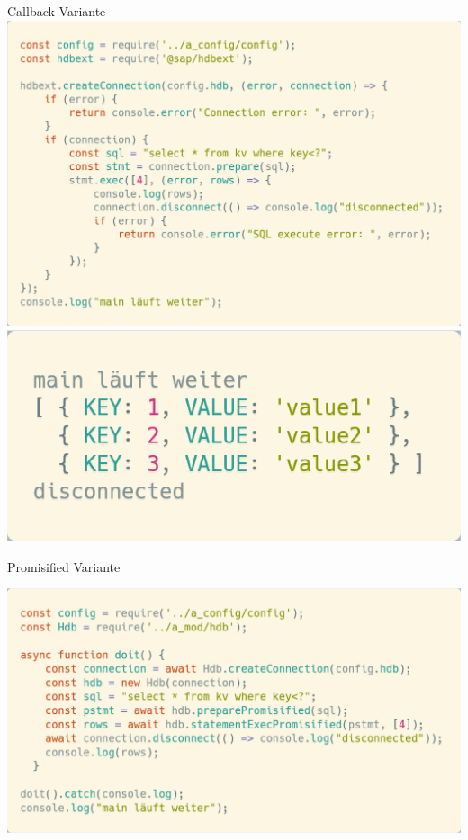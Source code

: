 \documentclass[t,handout]{beamer}
\begin{document}
\begin{frame}{Callback-Variante}
    \includegraphics[scale=.24]{fig/hdb-cb.png}\\[-1.6cm]
    \hfill\includegraphics[scale=.21]{fig/hdb-cb-result.png}
\end{frame}

\begin{frame}{Promisified Variante}
  \begin{center}
    \includegraphics[scale=.24]{fig/hdb-promise.png}
  \end{center}
\end{frame}
\end{document}
